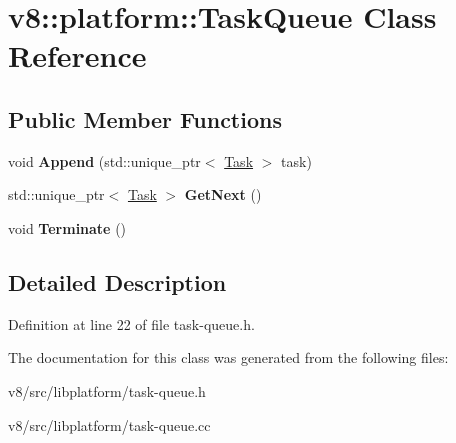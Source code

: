 \hypertarget{classv8_1_1platform_1_1TaskQueue}{}\section{v8\+:\+:platform\+:\+:Task\+Queue Class Reference}
\label{classv8_1_1platform_1_1TaskQueue}
\subsection*{Public Member Functions}
\begin{DoxyCompactItemize}
\item 
\mbox{\label{classv8_1_1platform_1_1TaskQueue_a9d1e1cea3b2bf911bbd69b1e30bf2f21}} 
void {\bfseries Append} (std\+::unique\+\_\+ptr$<$ \mbox{\hyperlink{classv8_1_1Task}{Task}} $>$ task)
\item 
\mbox{\label{classv8_1_1platform_1_1TaskQueue_a168f8789c346eda3736d57a44db6a3bc}} 
std\+::unique\+\_\+ptr$<$ \mbox{\hyperlink{classv8_1_1Task}{Task}} $>$ {\bfseries Get\+Next} ()
\item 
\mbox{\label{classv8_1_1platform_1_1TaskQueue_a603c0ef6966c3365db6904199488e978}} 
void {\bfseries Terminate} ()
\end{DoxyCompactItemize}


\subsection{Detailed Description}


Definition at line 22 of file task-\/queue.\+h.



The documentation for this class was generated from the following files\+:\begin{DoxyCompactItemize}
\item 
v8/src/libplatform/task-\/queue.\+h\item 
v8/src/libplatform/task-\/queue.\+cc\end{DoxyCompactItemize}
